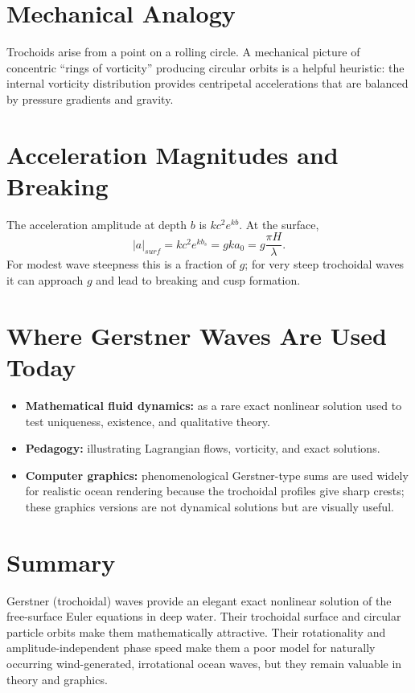\documentclass[journal,10pt,twocolumn]{IEEEtran}
\def\mathbf#1{#1}%
\def\mathrm#1{#1}%
\begin{document}
\section{Mechanical Analogy}

Trochoids arise from a point on a rolling circle. A mechanical picture of concentric ``rings of vorticity'' producing circular orbits is a helpful heuristic: the internal vorticity distribution provides centripetal accelerations that are balanced by pressure gradients and gravity.

\section{Acceleration Magnitudes and Breaking}

The acceleration amplitude at depth $b$ is $k c^2 e^{k b}$. At the surface,
\[
    |\mathbf{a}|_{\mathrm{surf}} = k c^2 e^{k b_s} = g k a_0 = g\frac{\pi H}{\lambda}.
\]
For modest wave steepness this is a fraction of $g$; for very steep trochoidal waves it can approach $g$ and lead to breaking and cusp formation.

\section{Where Gerstner Waves Are Used Today}

\begin{itemize}[leftmargin=1.4em]
    \item \textbf{Mathematical fluid dynamics:} as a rare exact nonlinear solution used to test uniqueness, existence, and qualitative theory.
    \item \textbf{Pedagogy:} illustrating Lagrangian flows, vorticity, and exact solutions.
    \item \textbf{Computer graphics:} phenomenological Gerstner-type sums are used widely for realistic ocean rendering because the trochoidal profiles give sharp crests; these graphics versions are not dynamical solutions but are visually useful.
\end{itemize}

\section{Summary}

Gerstner (trochoidal) waves provide an elegant exact nonlinear solution of the free-surface Euler equations in deep water. Their trochoidal surface and circular particle orbits make them mathematically attractive. Their rotationality and amplitude-independent phase speed make them a poor model for naturally occurring wind-generated, irrotational ocean waves, but they remain valuable in theory and graphics.
\end{document}
